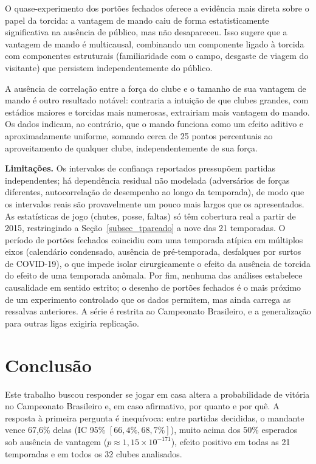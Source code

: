 \documentclass[pdflatex,sn-mathphys-num]{sn-jnl}%
\theoremstyle{thmstyleone}%
\theoremstyle{thmstyletwo}%
\theoremstyle{thmstylethree}%
\begin{document}
O quase-experimento dos portões fechados oferece a evidência mais direta sobre o papel da torcida: a vantagem de mando caiu de forma estatisticamente significativa na ausência de público, mas não desapareceu. Isso sugere que a vantagem de mando é multicausal, combinando um componente ligado à torcida com componentes estruturais (familiaridade com o campo, desgaste de viagem do visitante) que persistem independentemente do público.

A ausência de correlação entre a força do clube e o tamanho de sua vantagem de mando é outro resultado notável: contraria a intuição de que clubes grandes, com estádios maiores e torcidas mais numerosas, extrairiam mais vantagem do mando. Os dados indicam, ao contrário, que o mando funciona como um efeito aditivo e aproximadamente uniforme, somando cerca de 25 pontos percentuais ao aproveitamento de qualquer clube, independentemente de sua força.

\textbf{Limitações.} Os intervalos de confiança reportados pressupõem partidas independentes; há dependência residual não modelada (adversários de forças diferentes, autocorrelação de desempenho ao longo da temporada), de modo que os intervalos reais são provavelmente um pouco mais largos que os apresentados. As estatísticas de jogo (chutes, posse, faltas) só têm cobertura real a partir de 2015, restringindo a Seção~\ref{subsec_tpareado} a nove das 21 temporadas. O período de portões fechados coincidiu com uma temporada atípica em múltiplos eixos (calendário condensado, ausência de pré-temporada, desfalques por surtos de COVID-19), o que impede isolar cirurgicamente o efeito da ausência de torcida do efeito de uma temporada anômala. Por fim, nenhuma das análises estabelece causalidade em sentido estrito; o desenho de portões fechados é o mais próximo de um experimento controlado que os dados permitem, mas ainda carrega as ressalvas anteriores. A série é restrita ao Campeonato Brasileiro, e a generalização para outras ligas exigiria replicação.

\section{Conclusão}\label{sec13}

Este trabalho buscou responder se jogar em casa altera a probabilidade de vitória no Campeonato Brasileiro e, em caso afirmativo, por quanto e por quê. A resposta à primeira pergunta é inequívoca: entre partidas decididas, o mandante vence 67,6\% delas (IC 95\% $[66{,}4\%, 68{,}7\%]$), muito acima dos 50\% esperados sob ausência de vantagem ($p \approx 1{,}15\times10^{-171}$), efeito positivo em todas as 21 temporadas e em todos os 32 clubes analisados.
\end{document}

